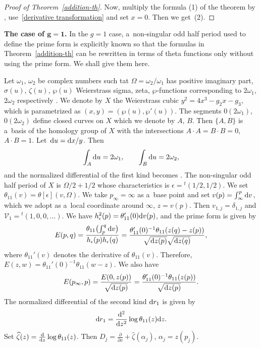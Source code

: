 \documentclass[pdftex]{sigma}
\numberwithin{equation}{section}
\theoremstyle{definition}
\begin{document}
\begin{proof}[Proof of Theorem~\ref{addition-th}]
Now, multiply the formula (1) of the theorem by
,
use~\eqref{derivative transformation} and set $x=0$. Then we get~(2).
\end{proof}

{\bf The case of $\boldsymbol{ g=1}$.}
In the $g=1$ case, a~non-singular odd half period used to define the prime form is explicitly
known so that the formulas in Theorem~\ref{addition-th} can be rewritten in terms of theta functions only without using the prime form. We shall give them here.

Let $\omega_1$, $\omega_2$ be complex numbers such tat $\Omega=\omega_2/\omega_1$ has
positive imaginary part, $\sigma(u)$, $\zeta(u)$, $\wp(u)$ Weierstrass sigma, zeta, $\wp$-functions corresponding to $2\omega_1$, $2\omega_2$ respectively
\cite{Whittaker-Watson1902}.
We denote by $X$ the Weierstrass cubic
$
y^2=4x^3-g_2x -g_3$,
which is parametrized as $(x,y)=(\wp(u),\wp'(u))$.
 The segments $0(2\omega_1)$, $0(2\omega_2)$
define closed curves on $X$ which we denote by $A$, $B$. Then $\{A,B\}$
is a~basis of the homology group of $X$ with the intersections $A\cdot A=B\cdot B=0$, $A\cdot B=1$. Let~${{\rm d}u={\rm d}x/y}$. Then
\[
\int_A {\rm d}u=2\omega_1,
\qquad
\int_B{\rm d}u=2\omega_2,
\]
and the normalized differential of the first kind becomes
.
The non-singular odd half period of $X$ is $\Omega/2+1/2$ whose characteristics
 is $\epsilon={}^t(1/2,1/2)$. We set
$
\theta_{11}(v)=\theta[\epsilon](v,\Omega)
$.
We take $p_\infty=\infty$ as a~base point and set
$
v(p)=\int_\infty^p {\rm d}v$,
which we adopt as a~local coordinate around $\infty$, $z=v(p)$.
Then $v_{1,j}=\delta_{1,j}$ and ${\mathcal V}_1={}^t(1,0,0,\dots )$.
We have
$
h_\epsilon^2(p)=\theta_{11}'(0){\rm d}v(p)$,
and the prime form is given by
\[
E(p,q)=\frac{\theta_{11}\bigl(\int_p^q {\rm d}v\bigr)}{h_\epsilon(p)h_\epsilon(q)}
=
\frac{\theta_{11}'(0)^{-1}\theta_{11}(z(q)-z(p))}{\sqrt{{\rm d}z(p)}\sqrt{{\rm d}z(q)}},
\]
where $\theta_{11}'(v)$ denotes the derivative of $\theta_{11}(v)$.
Therefore, $
E(z,w)=\theta_{11}'(0)^{-1}\theta_{11}(w-z)$.
We also have
\[
E(p_\infty,p)=\frac{E(0,z(p))}{\sqrt{{\rm d}z(p)}}=
\frac{\theta_{11}'(0)^{-1}\theta_{11}(z(p))}{\sqrt{{\rm d}z(p)}}.
\]
The normalized differential of the second kind ${\rm d}r_1$ is given by
\[
{\rm d}r_1=\frac{{\rm d}^2}{{\rm d}z^2}\log \theta_{11}(z) {\rm d}z.
\]
Set
$
\widehat{\zeta}(z)=\frac{{\rm d}}{{\rm d}z}\log\theta_{11}(z)$.
Then
$
D_j=\frac{\partial}{\partial v}+\widehat{\zeta}(\alpha_j)$,
$
\alpha_j=z(p_j)$.
\end{document}

